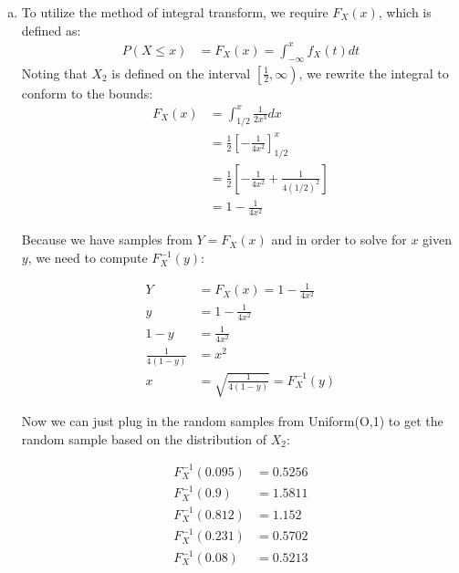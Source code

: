 \documentclass[11pt]{article}
\begin{document}
\begin{enumerate}[(a)]
    We note that as $k \ge 1$, $\alpha_k$ and $\mathcal{Y}$ are strictly positive and we can remove the absolute value operator:

    \begin{align*}
      f_Y(y) &= 
      \begin{cases}
        \frac{\alpha_k}{e^{y(k+1)}} e^y = \frac{\alpha_k}{e^{ky}} & y \in \mathcal{Y} \\
        0 & \text{ otherwise }
      \end{cases}
    \end{align*}

  \item To utilize the method of integral transform, we require $F_X(x)$, which is defined as:
    \begin{align*}
      P(X \le x) &= F_X(x) = \int_{-\infty}^x f_X(t) dt
    \end{align*}
    Noting that $X_2$ is defined on the interval $\left[ \frac{1}{2}, \infty \right)$, we rewrite the integral to conform to the bounds:
    \begin{align*}
      F_X(x) &= \int_{1/2}^{x} \frac{1}{2x^{3}} dx \\
      &= \frac{1}{2} \left[ -\frac{1}{4x^2} \right]_{1/2}^x \\
      &= \frac{1}{2} \left[ -\frac{1}{4x^2} + \frac{1}{4(1/2)^2} \right] \\
      &= 1 - \frac{1}{4x^2}
    \end{align*}

    Because we have samples from $Y = F_X(x)$ and in order to solve for $x$ given $y$, we need to compute $F_X^{-1}(y)$:

    \begin{align*}
      Y &= F_X(x) = 1 - \frac{1}{4x^2} \\
      y &= 1 - \frac{1}{4x^2} \\
      1 - y &= \frac{1}{4x^2} \\
      \frac{1}{4(1-y)} &= x^2 \\
      x &= \sqrt{\frac{1}{4(1-y)}} = F_X^{-1}(y)
    \end{align*}

    Now we can just plug in the random samples from Uniform(O,1) to get the random sample based on the distribution of $X_2$:

    \begin{align*}
      F_X^{-1}(0.095) &= 0.5256 \\
      F_X^{-1}(0.9) &= 1.5811 \\
      F_X^{-1}(0.812) &= 1.152 \\
      F_X^{-1}(0.231) &= 0.5702 \\
      F_X^{-1}(0.08) &= 0.5213
    \end{align*}

\end{enumerate}
\end{document}
